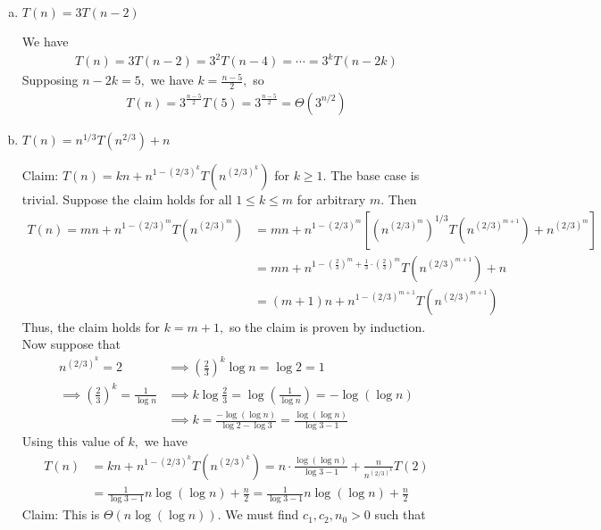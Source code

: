 \documentclass{article}
\begin{document}
\begin{enumerate}[(a)]
	\item $T(n)=3T(n-2)$
		\begin{soln}
			We have
			\begin{align*}
				T(n)=3T(n-2)=3^2T(n-4)=\cdots=3^kT(n-2k)
			\end{align*}
			Supposing $n-2k=5,$ we have $k=\frac{n-5}{2},$ so
			\begin{align*}
				T(n)=3^{\frac{n-5}{2}}T(5)=3^{\frac{n-5}{2}}=\Theta(3^{n/2})
			\end{align*}
		\end{soln}

	\item $T(n)=n^{1/3} T(n^{2/3}) + n$
		\begin{soln}
			Claim: $T(n)=kn+n^{1-(2/3)^k}T\left( n^{(2/3)^k} \right)$ for $k\ge 1.$ The base case is trivial. Suppose the claim holds for all $1\le k\le m$ for arbitrary $m.$ Then
			\begin{align*}
				T(n) = mn+n^{1-(2/3)^m} T\left( n^{(2/3)^m} \right) &= mn + n^{1-(2/3)^m} \left[ \left( n^{(2/3)^m} \right)^{1/3} T\left( n^{(2/3)^{m+1}} \right) + n^{(2/3)^m} \right] \\
				&= mn + n^{1-\left( \frac{2}{3} \right)^m + \frac{1}{3}\cdot\left( \frac{2}{3} \right)^m} T\left( n^{(2/3)^{m+1}} \right) + n \\
				&= (m+1)n + n^{1-(2/3)^{m+1}}T\left( n^{(2/3)^{m+1}} \right)
			\end{align*}
			Thus, the claim holds for $k=m+1,$ so the claim is proven by induction. Now suppose that
			\begin{align*}
				n^{(2/3)^k} = 2 &\implies \left( \frac{2}{3} \right)^k\log n = \log 2 = 1 \\
				\implies \left( \frac{2}{3} \right)^k = \frac{1}{\log n} &\implies k\log \frac{2}{3} = \log\left( \frac{1}{\log n} \right) = -\log(\log n) \\
				&\implies k = \frac{-\log(\log n)}{\log 2-\log 3} = \frac{\log(\log n)}{\log 3-1}
			\end{align*}
			Using this value of $k,$ we have
			\begin{align*}
				T(n) &= kn + n^{1-(2/3)^k} T\left(n^{(2/3)^k}\right) = n\cdot \frac{\log(\log n)}{\log 3 - 1} + \frac{n}{n^{(2/3)^k}} T(2) \\
				&= \frac{1}{\log 3 - 1} n\log(\log n) + \frac{n}{2} = \frac{1}{\log 3 - 1}n\log(\log n) + \frac{n}{2}
			\end{align*}
			Claim: This is $\Theta\left( n\log(\log n) \right).$ We must find $c_1, c_2, n_0>0$ such that 

\end{soln}
\end{enumerate}
\end{document}
